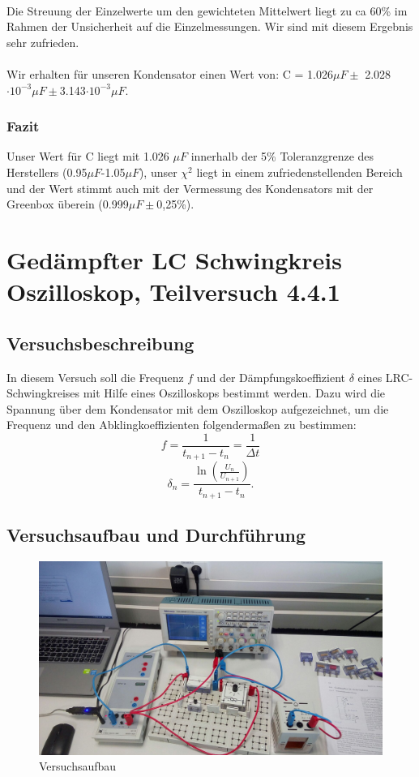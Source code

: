 \documentclass[12pt,a4paper]{article}
\begin{document}
\\Die Streuung der Einzelwerte um den gewichteten Mittelwert liegt zu ca 60\% im Rahmen der Unsicherheit auf die Einzelmessungen. Wir sind mit diesem Ergebnis sehr zufrieden.\\
\\Wir erhalten für unseren Kondensator einen Wert von: C = 1.026$\mu F \pm$ 2.028$\cdot 10^{-3}\mu F \pm$3.143$\cdot 10^{-3}\mu F$. 

\subsubsection{Fazit}
Unser Wert für C liegt mit 1.026 $\mu F$ innerhalb der 5\% Toleranzgrenze des Herstellers (0.95$\mu F$-1.05$\mu F$), unser $\chi^2$ liegt in einem zufriedenstellenden Bereich und der Wert stimmt auch mit der Vermessung des Kondensators mit der Greenbox überein (0.999$\mu F \pm$0,25\%).\\

\section{Gedämpfter LC Schwingkreis Oszilloskop, Teilversuch 4.4.1}
\subsection{Versuchsbeschreibung}
In diesem Versuch soll die Frequenz $f$ und der Dämpfungskoeffizient $\delta$ eines LRC-Schwingkreises mit Hilfe eines Oszilloskops bestimmt werden. \newline
Dazu wird die Spannung über dem Kondensator mit dem Oszilloskop aufgezeichnet, um die Frequenz und den Abklingkoeffizienten folgendermaßen zu bestimmen:
\begin{equation}
f=\frac{1}{t_{n+1}-t_n}=\frac{1}{\Delta t}
\end{equation}
\begin{equation}
\delta_n=\frac{\ln{(\frac{U_n}{U_{n+1}})}}{t_{n+1}-t_n}.
\end{equation}


\subsection{Versuchsaufbau und Durchführung}

\begin{figure}[H]
\centering
\includegraphics[scale=0.27]{ArbeitsplatzE_1.jpg}
\caption{Versuchsaufbau}
\end{figure}
\end{document}
